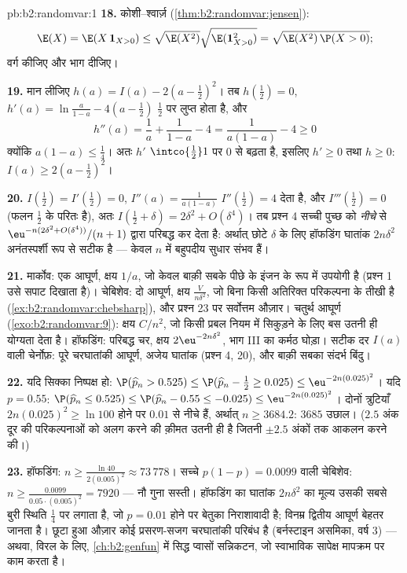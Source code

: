 \begin{solution}{pb:b2:randomvar:1}
\textbf{18.} कोशी--श्वार्ज़ (\cref{thm:b2:randomvar:jensen}):
\[
\E(X) = \E(X\,\mathbf 1_{X>0})
\leq \sqrt{\E(X^2)}\sqrt{\E(\mathbf 1_{X>0}^2)}
= \sqrt{\E(X^2)\,\P(X > 0)} ;
\]
वर्ग कीजिए और भाग दीजिए।

\textbf{19.} मान लीजिए $h(a) = I(a) - 2(a - \tfrac12)^2$। तब $h(\tfrac12) = 0$, $h'(a) = \ln\frac a{1-a} - 4(a -
\tfrac12)$ $\tfrac12$ पर लुप्त होता है, और
\[
h''(a) = \frac1a + \frac1{1-a} - 4 = \frac{1}{a(1-a)} - 4
\geq 0
\]
क्योंकि $a(1-a) \leq \frac14$। अतः $h'$ $\intco{\frac12}1$ पर $0$ से बढ़ता है, इसलिए $h' \geq 0$ तथा $h \geq 0$:
$I(a)
\geq 2(a - \tfrac12)^2$।

\textbf{20.} $I(\tfrac12) = I'(\tfrac12) = 0$, $I''(a) =
\frac1{a(1-a)}$ $I''(\tfrac12) = 4$ देता है, और $I'''(\tfrac12)
= 0$ (फलन $\tfrac12$ के परितः 
है), अतः $I(\tfrac12 + \delta) = 2\delta^2 + O(\delta^4)$। तब प्रश्न 4 सच्ची पुच्छ को \emph{नीचे} से $\eu^{-n(2\delta^2 + O(\delta^4))}/(n+1)$ द्वारा
परिबद्ध कर देता है: अर्थात् छोटे $\delta$ के लिए हॉफडिंग घातांक $2n\delta^2$
अनंतस्पर्शी रूप से सटीक है --- केवल $n$ में बहुपदीय सुधार संभव हैं।

\textbf{21.} मार्कोव: एक आघूर्ण, क्षय $1/a$, जो केवल बाक़ी सबके पीछे
के इंजन के रूप में उपयोगी है (प्रश्न 1 उसे सपाट दिखाता है)।
चेबिशेव: दो आघूर्ण, क्षय $\frac{V}{n\delta^2}$, जो बिना किसी अतिरिक्त परिकल्पना के
तीखी है (\cref{ex:b2:randomvar:chebsharp}), और प्रश्न 23 पर सर्वोत्तम औज़ार। चतुर्थ आघूर्ण
(\cref{exo:b2:randomvar:9}): क्षय $C/n^2$, जो किसी प्रबल नियम में सिकुड़ने के लिए बस उतनी
ही योग्यता देता है। हॉफडिंग: परिबद्ध चर, क्षय $2\eu^{-2n\delta^2}$, भाग III का
कर्मठ घोड़ा। सटीक दर $I(a)$ वाली चेर्नोफ़: पूरे चरघातांकी आघूर्ण,
अजेय घातांक (प्रश्न 4, 20), और बाक़ी सबका संदर्भ बिंदु।

\textbf{22.} यदि सिक्का निष्पक्ष हो: $\P(\widehat p_n > 0.525)
\leq \P(\widehat p_n - \tfrac12 \geq 0.025) \leq
\eu^{-2n(0.025)^2}$। यदि $p = 0.55$: $\P(\widehat p_n \leq
0.525) \leq \P(\widehat p_n - 0.55 \leq -0.025) \leq
\eu^{-2n(0.025)^2}$। दोनों
त्रुटियाँ $2n(0.025)^2 \geq \ln 100$ होने पर $0.01$ से नीचे हैं, अर्थात् $n \geq 3684.2$: $3685$ उछाल।
($2.5$ अंक दूर की परिकल्पनाओं को अलग करने की क़ीमत उतनी ही है जितनी
$\pm2.5$ अंकों तक आकलन करने की।)

\textbf{23.} हॉफडिंग: $n \geq \frac{\ln 40}{2(0.005)^2}
\approx 73\,778$। सच्चे  $p(1-p)
= 0.0099$ वाली चेबिशेव: $n \geq \frac{0.0099}{0.05\cdot(0.005)^2} =
7920$ ---
नौ गुना सस्ती। हॉफडिंग का घातांक $2n\delta^2$  का मूल्य उसकी सबसे बुरी
स्थिति $\frac14$ पर लगाता है, जो $p = 0.01$ होने पर बेतुका निराशावादी है; विनम्र
द्वितीय आघूर्ण बेहतर जानता है। छूटा हुआ औज़ार कोई प्रसरण-सजग
चरघातांकी परिबंध है (बर्नस्टाइन असमिका, वर्ष 3) --- अथवा, विरल
 के लिए, \cref{ch:b2:genfun} में सिद्ध प्वासों सन्निकटन, जो स्वाभाविक सापेक्ष
मापक्रम पर काम करता है।


\end{solution}
